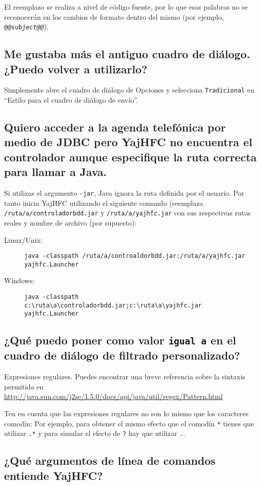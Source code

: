 \documentclass[a4paper,10pt]{scrartcl}
\begin{document}
El reemplazo se realiza a nivel de código fuente, por lo que esas palabras no se reconocerán en los cambios de formato dentro del mismo (por ejemplo, \texttt{@@sub\textit{ject@@}}).

\subsection{Me gustaba más el antiguo cuadro de diálogo. ¿Puedo volver a utilizarlo?}

Simplemente abre el cuadro de diálogo de Opciones y selecciona \texttt{Tradicional} en ``Estilo para el cuadro de diálogo de envío''.

\subsection{Quiero acceder a la agenda telefónica por medio de JDBC pero YajHFC no encuentra el controlador aunque especifique la ruta correcta para llamar a Java.}

Si utilizas el argumento \texttt{-jar}, Java ignora la ruta definida por el usuario.
Por tanto inicia YajHFC utilizando el siguiente comando (reemplaza \texttt{/ruta/a/controladorbdd.jar} y \texttt{/ruta/a/yajhfc.jar} con sus respectivas rutas reales y nombre de archivo (por supuesto):
\begin{description}
\item [Linux/Unix:] \verb#java -classpath /ruta/a/controaldorbdd.jar:/ruta/a/yajhfc.jar yajhfc.Launcher#
\item [Windows:] \verb#java -classpath c:\ruta\a\controladorbdd.jar;c:\ruta\a\yajhfc.jar yajhfc.Launcher#
\end{description}

\subsection{¿Qué puedo poner como valor \texttt{igual a} en el cuadro de diálogo de filtrado personalizado? }

Expresiones regulares. Puedes encontrar una breve referencia sobre la sintaxis permitida en
\url{http://java.sun.com/j2se/1.5.0/docs/api/java/util/regex/Pattern.html}

Ten en cuenta que las expresiones regulares no son lo mismo que los caracteres comodín:
Por ejemplo, para obtener el mismo efecto que el comodín \verb.*. tienes que utilizar \verb#.*#
y para simular el efecto de \verb#?# hay que utilizar \verb#.#.

\subsection{¿Qué argumentos de línea de comandos entiende YajHFC?}
\end{document}
